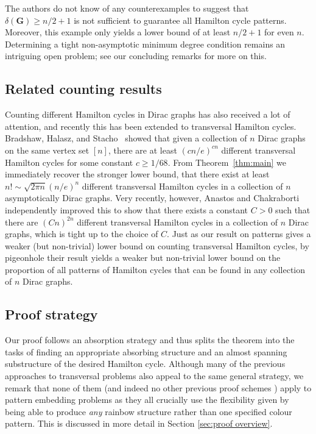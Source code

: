 \documentclass[11pt, dvipsnames]{amsart}
\theoremstyle{plain}
\theoremstyle{definition}
\begin{document}
 
 The authors do not know of any counterexamples to suggest that $\delta(\mathbf{G})\geq n/2+1$ is not sufficient to guarantee all Hamilton cycle patterns. Moreover, this example only yields a lower bound of at least $ n/2+1$ for even $n$. Determining a tight non-asymptotic minimum degree condition remains an intriguing open problem; see our concluding remarks for more on this. 

 \subsection{Related counting results}

Counting different Hamilton cycles in Dirac graphs has also received a lot of attention, and recently this has been  extended to transversal Hamilton cycles. Bradshaw, Halasz, and Stacho~\cite{bhs} showed that given a collection of $n$ Dirac graphs on the same vertex set $[n]$, there are at least $(cn/e)^{cn}$ different transversal Hamilton cycles for some constant $c \geq 1/68$. From Theorem~\ref{thm:main} we immediately recover the stronger lower bound, that there exist at least $n!\sim \sqrt{2\pi n}(n/e)^n$ different transversal Hamilton cycles in a collection of $n$ asymptotically Dirac graphs. Very recently, however, Anastos and Chakraborti~\cite{ac} independently improved this to show that there exists a constant $C>0$ such that there are $(Cn)^{2n}$ different transversal Hamilton cycles in a collection of $n$ Dirac graphs, which is tight up to the choice of $C$.
Just as our result on patterns gives a weaker (but non-trivial) lower bound on counting transversal Hamilton cycles, by pigeonhole their result yields a weaker but non-trivial lower bound on the proportion of all patterns of Hamilton cycles that can be found in any collection of $n$ Dirac graphs.

\subsection{Proof strategy}
Our proof follows an absorption strategy and thus splits the theorem into the tasks of finding an appropriate absorbing structure and an almost spanning substructure of the desired Hamilton cycle. 
Although many of the previous approaches \cite{CIKL,chakraborti2023hamilton,Cheng2,chwwy,Cheng1,ghmps,mmp} to transversal problems also appeal to the same general strategy, we remark that none of them (and indeed no other previous proof schemes \cite{staden_rainbow,jooskim}) apply to pattern embedding problems as they all crucially use the flexibility given by being able to produce \emph{any} rainbow structure rather than one specified colour pattern. 
This is discussed in more detail in Section \ref{sec:proof overview}. 
\end{document}
